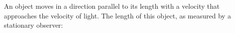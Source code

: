 An object moves in a direction parallel to its length with a velocity 
that approaches the velocity of light. 
The length of this object, as measured by a stationary observer: